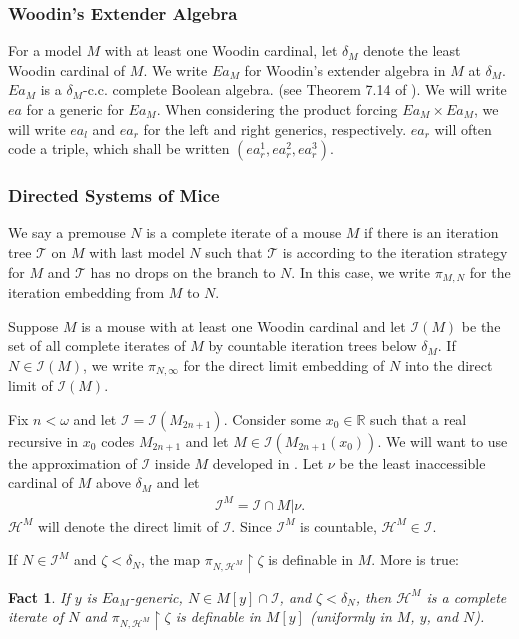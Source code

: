 \documentclass[12pt]{article}
\newtheorem{fact}[theorem]{Fact}
\newcommand\I{\mathcal{I}}
\renewcommand\H{\mathcal{H}}
\newcommand\T{\mathcal{T}}
\newcommand\R{\mathbb{R}}
\begin{document}
{\subsubsection*{Woodin's Extender Algebra}

For a model $M$ with at least one Woodin cardinal, let $\delta_M$ denote the least Woodin cardinal of $M$. We write $Ea_M$ for Woodin's extender algebra in $M$ at $\delta_M$. $Ea_M$ is a $\delta_M$-c.c. complete Boolean algebra. (see Theorem 7.14 of \cite{ooimt}). We will write $ea$ for a generic for $Ea_M$. When considering the product forcing $Ea_M\times Ea_M$, we will write $ea_l$ and $ea_r$ for the left and right generics, respectively. $ea_r$ will often code a triple, which shall be written $(ea_r^1,ea_r^2,ea_r^3)$.

\subsubsection*{Directed Systems of Mice}

We say a premouse $N$ is a complete iterate of a mouse $M$ if there is an iteration tree $\T$ on $M$ with last model $N$ such that $\T$ is according to the iteration strategy for $M$ and $\T$ has no drops on the branch to $N$. In this case, we write $\pi_{M,N}$ for the iteration embedding from $M$ to $N$.

Suppose $M$ is a mouse with at least one Woodin cardinal and let $\I(M)$ be the set of all complete iterates of $M$ by countable iteration trees below $\delta_M$. If $N\in \I(M)$, we write $\pi_{N,\infty}$ for the direct limit embedding of $N$ into the direct limit of $\I(M)$.

Fix $n<\omega$ and let $\I = \I(M_{2n+1})$. Consider some $x_0\in\R$ such that a real recursive in $x_0$ codes $M_{2n+1}$ and let $M\in \I(M_{2n+1}(x_0))$. We will want to use the approximation of $\I$ inside $M$ developed in \cite{hra}. Let $\nu$ be the least inaccessible cardinal of $M$ above $\delta_M$ and let
\begin{align*}
    \I^M = \I \cap M|\nu.
\end{align*}
$\H^M$ will denote the direct limit of $\I$. Since $\I^M$ is countable, $\H^M\in \I$. 

If $N\in \I^M$ and $\zeta < \delta_N$, the map $\pi_{N,\H^M}\upharpoonright \zeta$ is definable in $M$. More is true:

\begin{fact}
\label{direct limit approx definable}
    If $y$ is $Ea_M$-generic, $N \in M[y]\cap \I$, and $\zeta<\delta_N$, then $\H^M$ is a complete iterate of $N$ and $\pi_{N,\H^M}\upharpoonright\zeta$ is definable in $M[y]$ (uniformly in $M$, $y$, and $N$). 
\end{fact}

}
\end{document}
